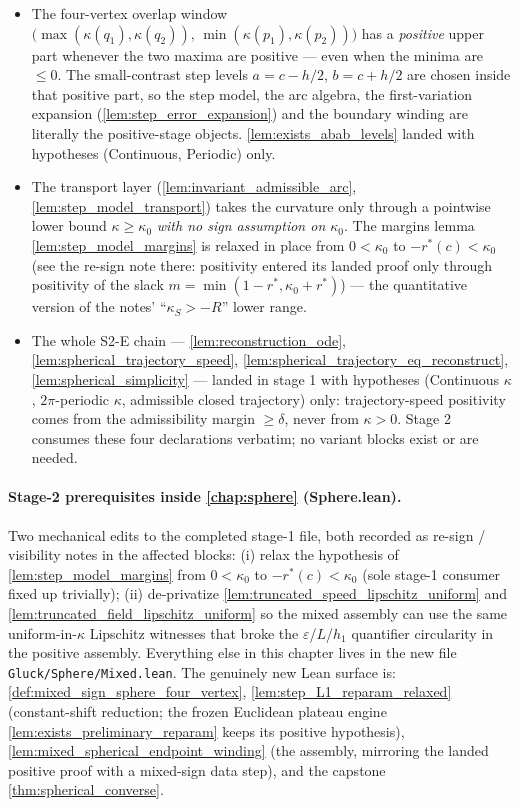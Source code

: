 \begin{itemize}
\item The four-vertex overlap window
  $\bigl(\max(\kappa(q_1),\kappa(q_2)),\,\min(\kappa(p_1),\kappa(p_2))\bigr)$
  has a \emph{positive} upper part whenever the two maxima are positive — even
  when the minima are $\le0$. The small-contrast step levels
  $a=c-h/2$, $b=c+h/2$ are chosen inside that positive part, so the step
  model, the arc algebra, the first-variation expansion
  (\cref{lem:step_error_expansion}) and the boundary winding are literally the
  positive-stage objects. \cref{lem:exists_abab_levels} landed with hypotheses
  (Continuous, Periodic) only.
\item The transport layer (\cref{lem:invariant_admissible_arc},
  \cref{lem:step_model_transport}) takes the curvature only through a
  pointwise lower bound $\kappa\ge\kappa_0$ \emph{with no sign assumption on
  $\kappa_0$}. The margins lemma \cref{lem:step_model_margins} is relaxed
  in place from $0<\kappa_0$ to $-r^\ast(c)<\kappa_0$ (see the re-sign note
  there: positivity entered its landed proof only through positivity of the
  slack $m=\min(1-r^\ast,\kappa_0+r^\ast)$) — the quantitative version of the
  notes' ``$\kappa_S>-R$'' lower range.
\item The whole S2-E chain — \cref{lem:reconstruction_ode},
  \cref{lem:spherical_trajectory_speed},
  \cref{lem:spherical_trajectory_eq_reconstruct},
  \cref{lem:spherical_simplicity} — landed in stage 1 with hypotheses
  (Continuous $\kappa$, $2\pi$-periodic $\kappa$, admissible closed
  trajectory) only: trajectory-speed positivity comes from the admissibility
  margin $\ge\delta$, never from $\kappa>0$. Stage 2 consumes these four
  declarations verbatim; no variant blocks exist or are needed.
\end{itemize}

\paragraph{Stage-2 prerequisites inside \cref{chap:sphere} (Sphere.lean).}
Two mechanical edits to the completed stage-1 file, both recorded as re-sign /
visibility notes in the affected blocks: (i) relax the hypothesis of
\cref{lem:step_model_margins} from $0<\kappa_0$ to $-r^\ast(c)<\kappa_0$ (sole
stage-1 consumer fixed up trivially); (ii) de-privatize
\cref{lem:truncated_speed_lipschitz_uniform} and
\cref{lem:truncated_field_lipschitz_uniform} so the mixed assembly can use the
same uniform-in-$\kappa$ Lipschitz witnesses that broke the
$\varepsilon$/$L$/$h_1$ quantifier circularity in the positive assembly.
Everything else in this chapter lives in the new file
\texttt{Gluck/Sphere/Mixed.lean}. The genuinely new Lean surface is:
\cref{def:mixed_sign_sphere_four_vertex},
\cref{lem:step_L1_reparam_relaxed} (constant-shift reduction; the frozen
Euclidean plateau engine \cref{lem:exists_preliminary_reparam} keeps its
positive hypothesis), \cref{lem:mixed_spherical_endpoint_winding} (the
assembly, mirroring the landed positive proof with a mixed-sign data step),
and the capstone \cref{thm:spherical_converse}.


